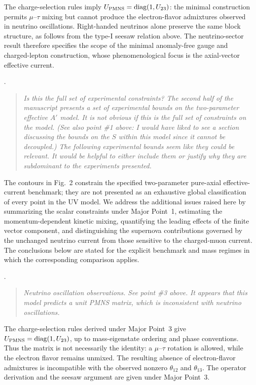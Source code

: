 \documentclass[12pt,a4paper]{article}
\begin{document}

The charge-selection rules imply \(U_{\rm PMNS}=\operatorname{diag}(1,U_{23})\): the minimal construction permits \(\mu\)--\(\tau\) mixing but cannot produce the electron-flavor admixtures observed in neutrino oscillations. Right-handed neutrinos alone preserve the same block structure, as follows from the type-I seesaw relation above. The neutrino-sector result therefore specifies the scope of the minimal anomaly-free gauge and charged-lepton construction, whose phenomenological focus is the axial-vector effective current.

\medskip
{}.
\begin{quote}\itshape
Is this the full set of experimental constraints? The second half of the manuscript presents a set of experimental bounds on the two-parameter effective \(A'\) model. It is not obvious if this is the full set of constraints on the model. (See also point \#1 above: I would have liked to see a section discussing the bounds on the \(S\) within this model since it cannot be decoupled.) The following experimental bounds seem like they could be relevant. It would be helpful to either include them or justify why they are subdominant to the experiments presented.
\end{quote}


The contours in Fig.~2 constrain the specified two-parameter pure-axial effective-current benchmark; they are not presented as an exhaustive global classification of every point in the UV model. We address the additional issues raised here by summarizing the scalar constraints under Major Point~1, estimating the momentum-dependent kinetic mixing, quantifying the leading effects of the finite vector component, and distinguishing the supernova contributions governed by the unchanged neutrino current from those sensitive to the charged-muon current. The conclusions below are stated for the explicit benchmark and mass regimes in which the corresponding comparison applies.

\medskip
{}.
\begin{quote}\itshape
Neutrino oscillation observations. See point \#3 above. It appears that this model predicts a unit PMNS matrix, which is inconsistent with neutrino oscillations.
\end{quote}


The charge-selection rules derived under Major Point~3 give \(U_{\rm PMNS}=\operatorname{diag}(1,U_{23})\), up to mass-eigenstate ordering and phase conventions. Thus the matrix is not necessarily the identity: a \(\mu\)--\(\tau\) rotation is allowed, while the electron flavor remains unmixed. The resulting absence of electron-flavor admixtures is incompatible with the observed nonzero \(\theta_{12}\) and \(\theta_{13}\). The operator derivation and the seesaw argument are given under Major Point~3.
\end{document}

